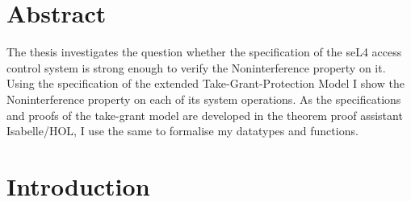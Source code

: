 \documentclass[11pt,a4paper,twoside]{article}
\begin{document}
	
	\deckblatt
	
	\declaration
	
	\clearpage
	\section*{Abstract}
	
	 The thesis investigates the question whether the specification of the seL4 access control system is strong enough to verify the Noninterference property on it. 
Using the specification of the extended Take-Grant-Protection Model \cite{TakeG} I show the Noninterference property \cite{InfFlow} on each of its system operations. 
As the specifications and proofs of the take-grant model are developed in the theorem proof assistant Isabelle/HOL, I use the same to formalise my datatypes and functions. 
	

	\newpage
	\listoffigures
	\newpage
	\tableofcontents

	
	\clearpage
	\section{Introduction}
\end{document}
